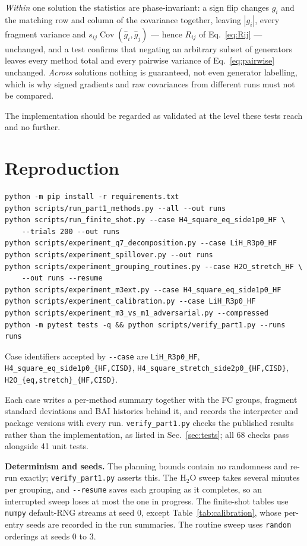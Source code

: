 \documentclass[10pt]{article}
\newcommand{\Cov}{\operatorname{Cov}}
\begin{document}
\emph{Within} one solution the statistics are phase-invariant: a sign flip changes
$g_i$ and the matching row and column of the covariance together, leaving $|g_i|$,
every fragment variance and $s_{ij}\Cov(\widehat g_i,\widehat g_j)$ --- hence
$R_{ij}$ of Eq.~\eqref{eq:Rij} --- unchanged, and a test confirms that negating an
arbitrary subset of generators leaves every method total and every pairwise
variance of Eq.~\eqref{eq:pairwise} unchanged. \emph{Across} solutions nothing is
guaranteed, not even generator labelling, which is why signed gradients and raw
covariances from different runs must not be compared.

The implementation should be regarded as validated at the level these tests reach
and no further.

\section{Reproduction}
\label{sec:reproduction}

\begin{verbatim}
python -m pip install -r requirements.txt
python scripts/run_part1_methods.py --all --out runs
python scripts/run_finite_shot.py --case H4_square_eq_side1p0_HF \
    --trials 200 --out runs
python scripts/experiment_q7_decomposition.py --case LiH_R3p0_HF
python scripts/experiment_spillover.py --out runs
python scripts/experiment_grouping_routines.py --case H2O_stretch_HF \
    --out runs --resume
python scripts/experiment_m3ext.py --case H4_square_eq_side1p0_HF
python scripts/experiment_calibration.py --case LiH_R3p0_HF
python scripts/experiment_m3_vs_m1_adversarial.py --compressed
python -m pytest tests -q && python scripts/verify_part1.py --runs runs
\end{verbatim}

Case identifiers accepted by \texttt{-{}-case} are
\texttt{LiH\_R3p0\_HF}, \texttt{H4\_square\_eq\_side1p0\_\{HF,CISD\}},
\texttt{H4\_square\_stretch\_side2p0\_\{HF,CISD\}},
\texttt{H2O\_\{eq,stretch\}\_\{HF,CISD\}}.

Each case writes a per-method summary together with the FC groups, fragment
standard deviations and BAI histories behind it, and records the interpreter and
package versions with every run. \texttt{verify\_part1.py} checks the published
results rather than the implementation, as listed in Sec.~\ref{sec:tests}; all 68
checks pass alongside 41 unit tests.

\textbf{Determinism and seeds.} The planning bounds contain no randomness and
re-run exactly; \texttt{verify\_part1.py} asserts this. The H$_2$O sweep takes
several minutes per grouping, and \texttt{-{}-resume} saves each grouping as it
completes, so an interrupted sweep loses at most the one in progress. The finite-shot tables use
\texttt{numpy} default-RNG streams at seed $0$, except Table~\ref{tab:calibration},
whose per-entry seeds are recorded in the run summaries. The routine sweep uses
\texttt{random} orderings at seeds $0$ to $3$.
\end{document}

